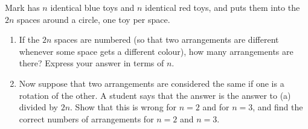 Mark has $n$ identical blue toys and $n$ identical red toys, and puts them into the $2n$ spaces around a circle, one toy per space.
\begin{enumerate}
\item[(a)] If the $2n$ spaces are numbered (so that two arrangements are different whenever some space gets a different colour), how many arrangements are there? Express your answer in terms of $n$.
\item[(b)] Now suppose that two arrangements are considered the same if one is a rotation of the other. A student says that the answer is the answer to (a) divided by $2n$. Show that this is wrong for $n=2$ and for $n=3$, and find the correct numbers of arrangements for $n=2$ and $n=3$.
\end{enumerate}
